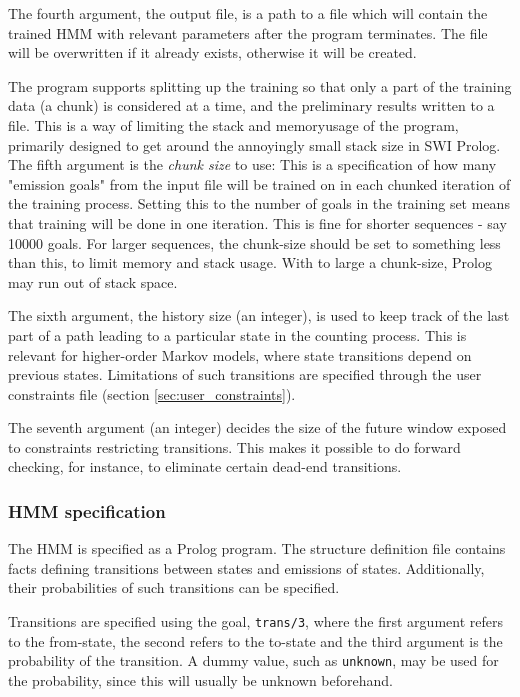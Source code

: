 \documentclass{article}
\begin{document}
The fourth argument, the output file, is a path to a file which will contain the trained HMM with relevant parameters after the program terminates.
The file will be overwritten if it already exists, otherwise it will be created. 

The program supports splitting up the training so that only a part of the training data (a chunk) is considered at a time, and the preliminary results written to a file.
This is a way of limiting the stack and memoryusage of the program, primarily designed to get around the annoyingly small stack size in SWI Prolog. The fifth argument is the \emph{chunk size} to use: This is a specification of how many "emission goals" from the input file will be trained on in each chunked iteration of the training process.
Setting this to the number of goals in the training set means that training will be done in one iteration. This is fine for shorter sequences - say 10000 goals. For larger sequences,
the chunk-size should be set to something less than this, to limit memory and stack usage. With to large a chunk-size, Prolog may run out of stack space.

The sixth argument, the history size (an integer), is used to keep track of the last part of a path leading to a particular state in the counting process. This is relevant for 
higher-order Markov models, where state transitions depend on previous states. Limitations of such transitions are specified through the user constraints file (section \ref{sec:user_constraints}).

The seventh argument (an integer) decides the size of the future window exposed to constraints restricting transitions. This makes it possible to do forward checking, for instance, to eliminate certain 
dead-end transitions.

\subsubsection{HMM specification}
\label{sec:hmmspec}

The HMM is specified as a Prolog program. The structure definition file contains facts defining transitions between states and emissions of states.
Additionally, their probabilities of such transitions can be specified.

Transitions are specified using the goal, \texttt{trans/3}, where the first argument refers to the from-state, the second refers to the to-state and the third argument
is the probability of the transition. A dummy value, such as \texttt{unknown},  may be used for the probability, since this will usually be unknown beforehand. 
\end{document}
